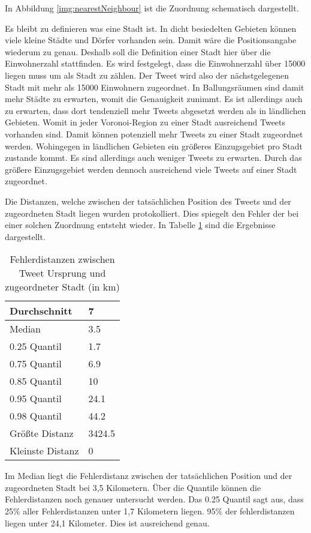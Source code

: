 			In Abbildung \ref{img:nearestNeighbour} ist die Zuordnung schematisch dargestellt.

			Es bleibt zu definieren was eine Stadt ist.
			In dicht besiedelten Gebieten können viele kleine Städte und Dörfer vorhanden sein. 
			Damit wäre die Positionsangabe wiederum zu genau.
			Deshalb soll die Definition einer Stadt hier über die Einwohnerzahl stattfinden.
			Es wird festgelegt, dass die Einwohnerzahl über 15000 liegen muss um als Stadt zu zählen. 
			Der Tweet wird also der nächstgelegenen Stadt mit mehr als 15000 Einwohnern zugeordnet.
			In Ballungsräumen sind damit mehr Städte zu erwarten, womit die Genauigkeit zunimmt.
			Es ist allerdings auch zu erwarten, dass dort tendenziell mehr Tweets abgesetzt werden als in ländlichen Gebieten.
			Womit in jeder Voronoi-Region zu einer Stadt ausreichend Tweets vorhanden sind.
			Damit können potenziell mehr Tweets zu einer Stadt zugeordnet werden.
			Wohingegen in ländlichen Gebieten ein größeres Einzugsgebiet pro Stadt zustande kommt.
			Es sind allerdings auch weniger Tweets zu erwarten. 
			Durch das größere Einzugsgebiet werden dennoch ausreichend viele Tweets auf einer Stadt zugeordnet. 

			Die Distanzen, welche zwischen der tatsächlichen Position des Tweets und der zugeordneten Stadt liegen wurden protokolliert. 
			Dies spiegelt den Fehler der bei einer solchen Zuordnung entsteht wieder.
			In Tabelle \ref{tab:distances} sind die Ergebnisse dargestellt.

			\begin{table}[h]
			\centering
			\caption{Fehlerdistanzen zwischen Tweet Ursprung und zugeordneter Stadt (in km)}
			\label{tab:distances}
			\begin{tabular}{|l|l|}
			Durchschnitt & 7      \\ \hline
			Median       & 3.5    \\ \hline
			0.25 Quantil & 1.7    \\ \hline
			0.75 Quantil & 6.9    \\ \hline
			0.85 Quantil & 10     \\ \hline
			0.95 Quantil & 24.1   \\ \hline
			0.98 Quantil & 44.2   \\ \hline
			Größte Distanz      & 3424.5 \\ \hline
			Kleinste Distanz     & 0     
			\end{tabular}
			\end{table}

			Im Median liegt die Fehlerdistanz zwischen der tatsächlichen Position und der zugeordneten Stadt bei 3,5 Kilometern.
			Über die Quantile können die Fehlerdistanzen noch genauer untersucht werden.
			Das 0.25 Quantil sagt aus, dass 25\% aller Fehlerdistanzen unter 1,7 Kilometern liegen.
			95\% der fehlerdistanzen liegen unter 24,1 Kilometer. 
			Dies ist ausreichend genau. 

